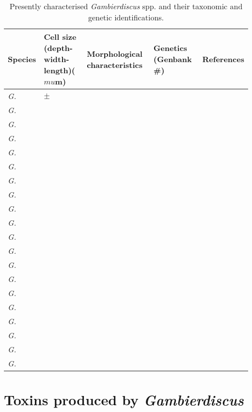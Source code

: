\begin{sidewaystable}[!htbp]
\caption{Presently characterised \emph{Gambierdiscus} spp. and their taxonomic and genetic identifications.}
\begin{tabular}{ |  p{4cm} | p{4cm} | p{4cm} | p{4cm} | p{4cm} | }
\hline
\textbf{Species} & \textbf{Cell size (depth-width-length)($mu$m)} & \textbf{Morphological characteristics} & \textbf{Genetics (Genbank \#)} & \textbf{References} \\
\hline
 \emph{G. } & $\pm$ &  &  & \\
\hline
 \emph{G. } &  &  &  & \\
\hline
 \emph{G. } &  &  &  & \\
\hline
 \emph{G. } &  &  &  & \\
\hline
 \emph{G. } &  &  &  & \\
\hline
 \emph{G. } &  &  &  & \\
\hline
 \emph{G. } &  &  &  & \\
\hline
 \emph{G. } &  &  &  & \\
\hline
 \emph{G. } &  &  &  & \\
\hline
 \emph{G. } &  &  &  & \\
\hline
 \emph{G. } &  &  &  & \\
\hline
 \emph{G. } &  &  &  & \\
\hline
 \emph{G. } &  &  &  & \\
\hline
 \emph{G. } &  &  &  & \\
\hline
 \emph{G. } &  &  &  & \\
\hline
 \emph{G. } &  &  &  & \\
\hline
 \emph{G. } &  &  &  & \\
\hline
 \emph{G. } &  &  &  & \\
\hline
 \emph{G. } &  &  &  & \\
\hline
 \emph{G. } &  &  &  & \\
\hline
\end{tabular}
\end{sidewaystable}
\FloatBarrier

\section{Toxins produced by \emph{Gambierdiscus}}

